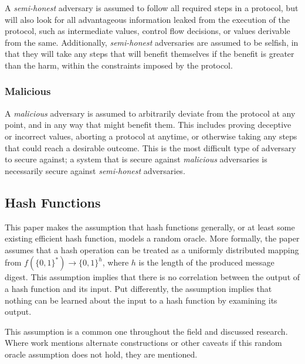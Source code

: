 A \emph{semi-honest} adversary is assumed to follow all required steps in a protocol, but will also look for all advantageous information leaked from the execution of the protocol, such as intermediate values, control flow decisions, or values derivable from the same\cite{goldreich1998secure}.  Additionally, \emph{semi-honest} adversaries are assumed to be selfish, in that they will take any steps that will benefit themselves if the benefit is greater than the harm, within the constraints imposed by the protocol.


\subsubsection{Malicious}

A \emph{malicious} adversary is assumed to arbitrarily deviate from the protocol at any point, and in any way that might benefit them\cite{goldreich1998secure}.  This includes proving deceptive or incorrect values, aborting a protocol at anytime, or otherwise taking any steps that could reach a desirable outcome.  This is the most difficult type of adversary to secure against; a system that is secure against \emph{malicious} adversaries is necessarily secure against \emph{semi-honest} adversaries.


\subsection{Hash Functions}

This paper makes the assumption that hash functions generally, or at least some existing efficient hash function, models a random oracle.  More formally, the paper assumes that a hash operation can be treated as a uniformly distributed mapping from $f(\{0, 1\}^{*}) \to \{0, 1\}^{h}$, where $h$ is the length of the produced message digest.  This assumption implies that there is no correlation between the output of a hash function and its input.  Put differently, the assumption implies that nothing can be learned about the input to a hash function by examining its output.

This assumption is a common one throughout the field and discussed research\cite{pinkas2009secure}.  Where work mentions alternate constructions or other caveats if this random oracle assumption does not hold, they are mentioned.
